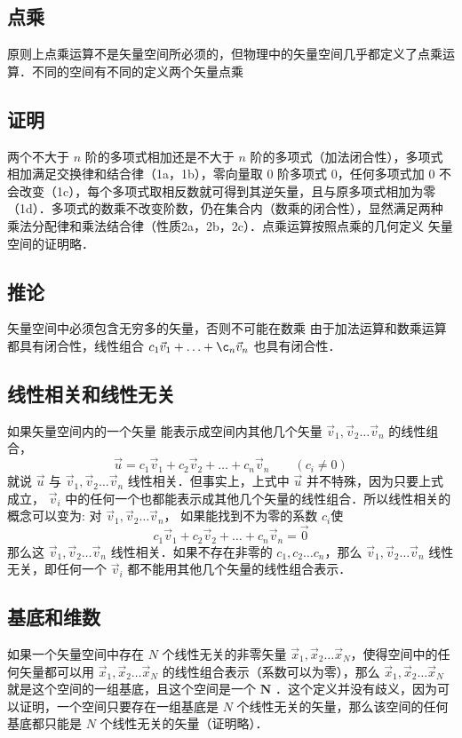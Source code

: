 \subsection{点乘}
原则上点乘运算不是矢量空间所必须的，但物理中的矢量空间几乎都定义了点乘运算．不同的空间有不同的定义两个矢量点乘

\subsection{证明}
两个不大于 $n$ 阶的多项式相加还是不大于 $n$ 阶的多项式（加法闭合性），多项式相加满足交换律和结合律（1a，1b），零向量取 0 阶多项式 0，任何多项式加 0 不会改变（1c），每个多项式取相反数就可得到其逆矢量，且与原多项式相加为零（1d）．多项式的数乘不改变阶数，仍在集合内（数乘的闭合性），显然满足两种乘法分配律和乘法结合律（性质2a，2b，2c）．点乘运算按照点乘的几何定义%
矢量空间的证明略．

\subsection{推论}
矢量空间中必须包含无穷多的矢量，否则不可能在数乘
由于加法运算和数乘运算都具有闭合性，线性组合 $c_1\vec v_1+\ldots +\c_n\vec v_n$ 也具有闭合性．

\subsection{线性相关和线性无关}

如果矢量空间内的一个矢量 能表示成空间内其他几个矢量 $\vec v_1, \vec v_2 \dots \vec v_n$ 的线性组合，
\begin{equation}
\vec u = c_1 \vec v_1 + c_2 \vec v_2 + \ldots + c_n \vec v_n \qquad (c_i \ne 0)
\end{equation} 
就说 $\vec u$ 与 $\vec v_1, \vec v_2 \dots \vec v_n$ 线性相关．但事实上，上式中 $\vec u$ 并不特殊，因为只要上式成立， $\vec v_i$ 中的任何一个也都能表示成其他几个矢量的线性组合．所以线性相关的概念可以变为: 对 $\vec v_1, \vec v_2 \dots \vec v_n$， 如果能找到不为零的系数 $c_i$使
\begin{equation}
c_1 \vec v_1 + c_2 \vec v_2+ \ldots + c_n \vec v_n = \vec 0
\end{equation} 
那么这 $\vec v_1, \vec v_2 \dots \vec v_n$ 线性相关．如果不存在非零的 $c_1, c_2 \dots c_n$，那么 $\vec v_1, \vec v_2 \dots \vec v_n$ 线性无关，即任何一个 $\vec v_i$ 都不能用其他几个矢量的线性组合表示．

\subsection{基底和维数}
如果一个矢量空间中存在 $N$ 个线性无关的非零矢量 $\vec x_1, \vec x_2 \dots \vec x_N$，使得空间中的任何矢量都可以用 $\vec x_1, \vec x_2 \dots \vec x_N$ 的线性组合表示（系数可以为零），那么 $\vec x_1, \vec x_2 \dots \vec x_N$ 就是这个空间的一组基底，且这个空间是一个 $\mathbf{N}$ ．这个定义并没有歧义，因为可以证明，一个空间只要存在一组基底是 $N$ 个线性无关的矢量，那么该空间的任何基底都只能是 $N$ 个线性无关的矢量（证明略）．
